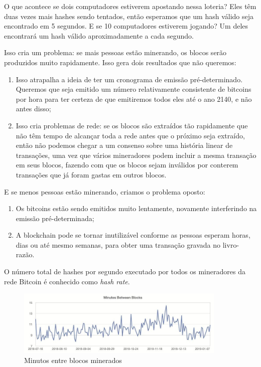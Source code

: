 O que acontece se dois computadores estiverem apostando nessa loteria? Eles têm duas vezes mais hashes sendo tentados, então esperamos que um hash válido seja encontrado em 5 segundos. E se 10 computadores estiverem jogando? Um deles encontrará um hash válido aproximadamente a cada segundo.

Isso cria um problema: se mais pessoas estão minerando, os blocos serão produzidos muito rapidamente. Isso gera dois resultados que não queremos:

\begin{enumerate}
\item Isso atrapalha a ideia de ter um cronograma de emissão pré-determinado. Queremos que seja emitido um número relativamente consistente de bitcoins por hora para ter certeza de que emitiremos todos eles até o ano 2140, e não antes disso;
\item Isso cria problemas de rede: se os blocos são extraídos tão rapidamente que não têm tempo de alcançar toda a rede antes que o próximo seja extraído, então não podemos chegar a um consenso sobre uma história linear de transações, uma vez que vários mineradores podem incluir a mesma transação em seus blocos, fazendo com que os blocos sejam inválidos por conterem transações que já foram gastas em outros blocos.
\end{enumerate}

E se menos pessoas estão minerando, criamos o problema oposto:
\begin{samepage}
\begin{enumerate}
\item Os bitcoins estão sendo emitidos muito lentamente, novamente interferindo na emissão pré-determinada;
\item A blockchain pode se tornar inutilizável conforme as pessoas esperam horas, dias ou até mesmo semanas, para obter uma transação gravada no livro-razão.
\end{enumerate}
\end{samepage}

O número total de hashes por segundo executado por todos os mineradores da rede Bitcoin é conhecido como \textit{hash rate}.

\begin{figure}
  \centering
  \includegraphics[width=10cm]{imagens/grafico2-capitulo-05.jpg}
  \caption{Minutos entre blocos minerados}
\end{figure}

